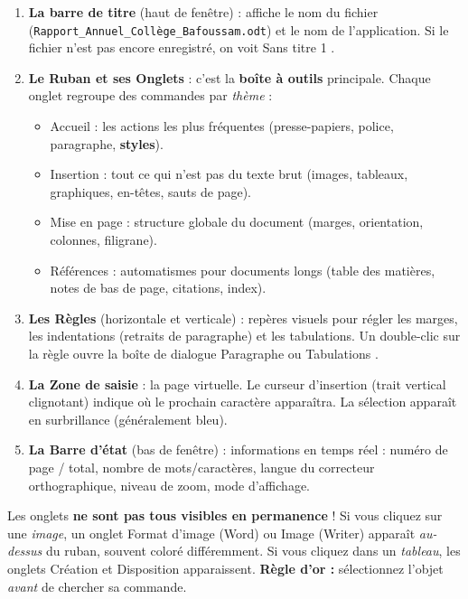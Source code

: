 \documentclass[11pt]{article}
\newcommand{\cle}[1]{{\popxbold\color{popdark}#1}}
\begin{document}
\begin{enumerate}
    \item \textbf{La barre de titre} (haut de fenêtre) : affiche le nom du fichier (\texttt{Rapport\_Annuel\_Collège\_Bafoussam.odt}) et le nom de l'application. Si le fichier n'est pas encore enregistré, on voit \og Sans titre 1 \fg{}.
    \item \textbf{Le Ruban et ses Onglets} : c'est la \textbf{boîte à outils} principale. Chaque onglet regroupe des commandes par \emph{thème} :
        \begin{itemize}
            \item \cle{Accueil} : les actions les plus fréquentes (presse-papiers, police, paragraphe, \textbf{styles}).
            \item \cle{Insertion} : tout ce qui n'est pas du texte brut (images, tableaux, graphiques, en-têtes, sauts de page).
            \item \cle{Mise en page} : structure globale du document (marges, orientation, colonnes, filigrane).
            \item \cle{Références} : automatismes pour documents longs (table des matières, notes de bas de page, citations, index).
        \end{itemize}
    \item \textbf{Les Règles} (horizontale et verticale) : repères visuels pour régler les \cle{marges}, les \cle{indentations} (retraits de paragraphe) et les \cle{tabulations}. Un double-clic sur la règle ouvre la boîte de dialogue \og Paragraphe \fg{} ou \og Tabulations \fg{}.
    \item \textbf{La Zone de saisie} : la page virtuelle. Le \cle{curseur d'insertion} (trait vertical clignotant) indique où le prochain caractère apparaîtra. La sélection apparaît en surbrillance (généralement bleu).
    \item \textbf{La Barre d'état} (bas de fenêtre) : informations en temps réel : numéro de page / total, nombre de mots/caractères, langue du correcteur orthographique, niveau de zoom, mode d'affichage.
\end{enumerate}

\begin{attention}
Les onglets \textbf{ne sont pas tous visibles en permanence} ! Si vous cliquez sur une \emph{image}, un onglet \og Format d'image \fg{} (Word) ou \og Image \fg{} (Writer) apparaît \emph{au-dessus} du ruban, souvent coloré différemment. Si vous cliquez dans un \emph{tableau}, les onglets \og Création \fg{} et \og Disposition \fg{} apparaissent. \textbf{Règle d'or :} sélectionnez l'objet \emph{avant} de chercher sa commande.
\end{attention}
\end{document}
